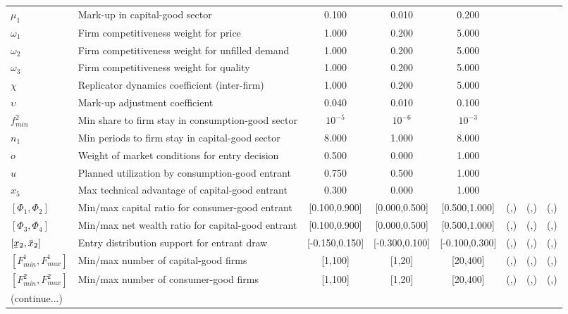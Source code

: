 \documentclass[a4paper,11pt]{article}
\newcommand\munderbar[1]{%
	\underaccent{\bar}{#1}}
\begin{document}
\begin{appendices}
\begin{landscape}
\begin{table}[ht]
\begin{tabular}{llcccccc}
$\mu_1$ 						& Mark-up in capital-good sector						& 0.100				& 0.010			& 0.200			& 					& 					& 	 \\
$\omega_1$ 						& Firm competitiveness weight for price					& 1.000				& 0.200			& 5.000			& 					& 					& 	 \\
$\omega_2$ 						& Firm competitiveness weight for unfilled demand 		& 1.000				& 0.200			& 5.000			& 					& 					& 	 \\
$\omega_3$ 						& Firm competitiveness weight for quality		 		& 1.000				& 0.200			& 5.000			& 					& 					& 	 \\
$\chi$							& Replicator dynamics coefficient (inter-firm)			& 1.000				& 0.200			& 5.000			& 					& 					& 	 \\
$\upsilon$ 						& Mark-up adjustment coefficient						& 0.040				& 0.010			& 0.100			& 					& 					& 	 \\
$f^2_{min}$ 					& Min share to firm stay in consumption-good sector		& $10^{-5}$			& $10^{-6}$		& $10^{-3}$		& 					& 					& 	 \\
$n_1$ 							& Min periods to firm stay in capital-good sector		& 8.000				& 1.000			& 8.000			& 					& 					& 	 \\
$o$ 							& Weight of market conditions for entry decision		& 0.500				& 0.000			& 1.000			& 					& 					& 	 \\
$u$ 							& Planned utilization by consumption-good entrant		& 0.750				& 0.500			& 1.000			& 					& 					& 	 \\
$x_5$ 							& Max technical advantage of capital-good entrant		& 0.300				& 0.000			& 1.000			& 					& 					& 	 \\
$[\Phi_1,\Phi_2]$ 				& Min/max capital ratio for consumer-good entrant		& [0.100,0.900]		& [0.000,0.500]	& [0.500,1.000]	& (,)				& (,)				& (,) \\
$[\Phi_3,\Phi_4]$ 				& Min/max net wealth ratio for capital-good entrant		& [0.100,0.900]		& [0.000,0.500]	& [0.500,1.000]	& (,)				& (,)				& (,) \\
$[\munderbar{x}_2,\bar{x}_2]$	& Entry distribution support for entrant draw			& [-0.150,0.150]	& [-0.300,0.100]& [-0.100,0.300]& (,)				& (,)				& (,) \\
$[F^1_{min},F^1_{max}]$			& Min/max number of capital-good firms					& [1,100]			& [1,20]		& [20,400]		& (,)				& (,)				& (,) \\
$[F^2_{min},F^2_{max}]$			& Min/max number of consumer-good firms					& [1,100]			& [1,20]		& [20,400]		& (,)				& (,)				& (,) \\
\bottomrule
(continue...)
\end{tabular}
\end{table}


\end{landscape}
\end{appendices}
\end{document}

